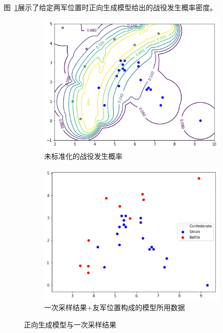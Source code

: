 \documentclass{article}
\begin{document}
图~\ref{fig:gettysburgTwo}展示了给定两军位置时正向生成模型给出的战役发生概率密度。

\begin{figure}[ht]
  \begin{subfigure}[b]{0.49\linewidth}
    \includegraphics[width=\linewidth]{gettysburg-forward.png}
    \caption{未标准化的战役发生概率}
  \end{subfigure}
  \begin{subfigure}[b]{0.49\linewidth}
    \includegraphics[width=\linewidth]{gettysburg-sample.png}
    \caption{一次采样结果+友军位置构成的模型所用数据}
  \end{subfigure}
  \caption{正向生成模型与一次采样结果}
  \label{fig:gettysburgTwo}
\end{figure}
\end{document}
